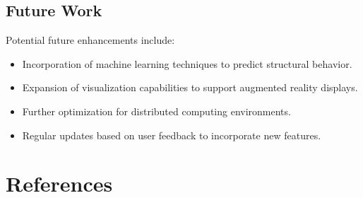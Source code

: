 \documentclass[12pt,a4paper]{report}
\begin{document}
\subsection{Future Work}
Potential future enhancements include:
\begin{itemize}
  \item Incorporation of machine learning techniques to predict structural behavior.
  \item Expansion of visualization capabilities to support augmented reality displays.
  \item Further optimization for distributed computing environments.
  \item Regular updates based on user feedback to incorporate new features.
\end{itemize}

\section{References}

\end{document}
